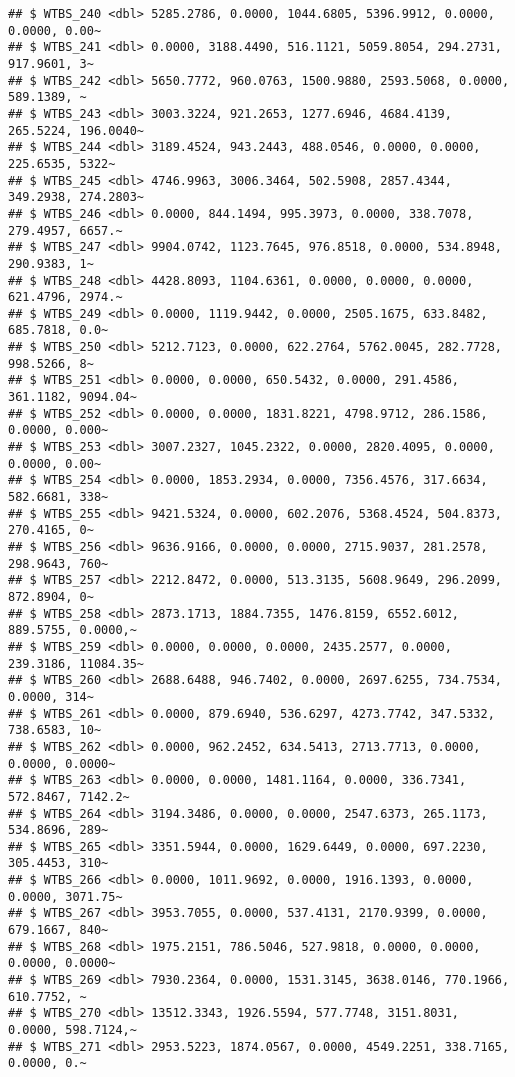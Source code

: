 \documentclass[
]{article}
\begin{document}
\begin{verbatim}
## $ WTBS_240 <dbl> 5285.2786, 0.0000, 1044.6805, 5396.9912, 0.0000, 0.0000, 0.00~
## $ WTBS_241 <dbl> 0.0000, 3188.4490, 516.1121, 5059.8054, 294.2731, 917.9601, 3~
## $ WTBS_242 <dbl> 5650.7772, 960.0763, 1500.9880, 2593.5068, 0.0000, 589.1389, ~
## $ WTBS_243 <dbl> 3003.3224, 921.2653, 1277.6946, 4684.4139, 265.5224, 196.0040~
## $ WTBS_244 <dbl> 3189.4524, 943.2443, 488.0546, 0.0000, 0.0000, 225.6535, 5322~
## $ WTBS_245 <dbl> 4746.9963, 3006.3464, 502.5908, 2857.4344, 349.2938, 274.2803~
## $ WTBS_246 <dbl> 0.0000, 844.1494, 995.3973, 0.0000, 338.7078, 279.4957, 6657.~
## $ WTBS_247 <dbl> 9904.0742, 1123.7645, 976.8518, 0.0000, 534.8948, 290.9383, 1~
## $ WTBS_248 <dbl> 4428.8093, 1104.6361, 0.0000, 0.0000, 0.0000, 621.4796, 2974.~
## $ WTBS_249 <dbl> 0.0000, 1119.9442, 0.0000, 2505.1675, 633.8482, 685.7818, 0.0~
## $ WTBS_250 <dbl> 5212.7123, 0.0000, 622.2764, 5762.0045, 282.7728, 998.5266, 8~
## $ WTBS_251 <dbl> 0.0000, 0.0000, 650.5432, 0.0000, 291.4586, 361.1182, 9094.04~
## $ WTBS_252 <dbl> 0.0000, 0.0000, 1831.8221, 4798.9712, 286.1586, 0.0000, 0.000~
## $ WTBS_253 <dbl> 3007.2327, 1045.2322, 0.0000, 2820.4095, 0.0000, 0.0000, 0.00~
## $ WTBS_254 <dbl> 0.0000, 1853.2934, 0.0000, 7356.4576, 317.6634, 582.6681, 338~
## $ WTBS_255 <dbl> 9421.5324, 0.0000, 602.2076, 5368.4524, 504.8373, 270.4165, 0~
## $ WTBS_256 <dbl> 9636.9166, 0.0000, 0.0000, 2715.9037, 281.2578, 298.9643, 760~
## $ WTBS_257 <dbl> 2212.8472, 0.0000, 513.3135, 5608.9649, 296.2099, 872.8904, 0~
## $ WTBS_258 <dbl> 2873.1713, 1884.7355, 1476.8159, 6552.6012, 889.5755, 0.0000,~
## $ WTBS_259 <dbl> 0.0000, 0.0000, 0.0000, 2435.2577, 0.0000, 239.3186, 11084.35~
## $ WTBS_260 <dbl> 2688.6488, 946.7402, 0.0000, 2697.6255, 734.7534, 0.0000, 314~
## $ WTBS_261 <dbl> 0.0000, 879.6940, 536.6297, 4273.7742, 347.5332, 738.6583, 10~
## $ WTBS_262 <dbl> 0.0000, 962.2452, 634.5413, 2713.7713, 0.0000, 0.0000, 0.0000~
## $ WTBS_263 <dbl> 0.0000, 0.0000, 1481.1164, 0.0000, 336.7341, 572.8467, 7142.2~
## $ WTBS_264 <dbl> 3194.3486, 0.0000, 0.0000, 2547.6373, 265.1173, 534.8696, 289~
## $ WTBS_265 <dbl> 3351.5944, 0.0000, 1629.6449, 0.0000, 697.2230, 305.4453, 310~
## $ WTBS_266 <dbl> 0.0000, 1011.9692, 0.0000, 1916.1393, 0.0000, 0.0000, 3071.75~
## $ WTBS_267 <dbl> 3953.7055, 0.0000, 537.4131, 2170.9399, 0.0000, 679.1667, 840~
## $ WTBS_268 <dbl> 1975.2151, 786.5046, 527.9818, 0.0000, 0.0000, 0.0000, 0.0000~
## $ WTBS_269 <dbl> 7930.2364, 0.0000, 1531.3145, 3638.0146, 770.1966, 610.7752, ~
## $ WTBS_270 <dbl> 13512.3343, 1926.5594, 577.7748, 3151.8031, 0.0000, 598.7124,~
## $ WTBS_271 <dbl> 2953.5223, 1874.0567, 0.0000, 4549.2251, 338.7165, 0.0000, 0.~

\end{verbatim}
\end{document}
